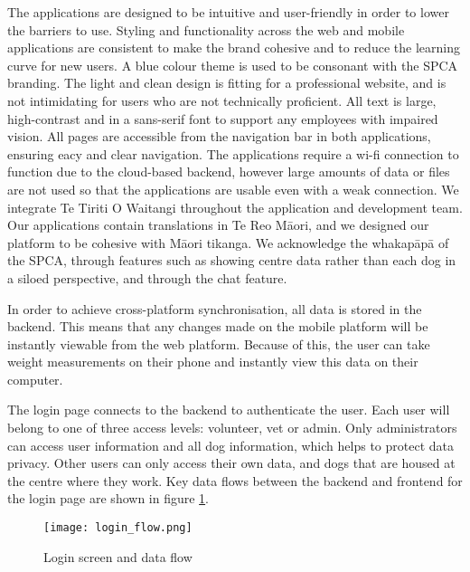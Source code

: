 The applications are designed to be intuitive and user-friendly in order to lower the barriers to use. Styling and functionality across the web and mobile applications are consistent to make the brand cohesive and to reduce the learning curve for new users. A blue colour theme is used to be consonant with the SPCA branding. The light and clean design is fitting for a professional website, and is not intimidating for users who are not technically proficient. All text is large, high-contrast and in a sans-serif font to support any employees with impaired vision. All pages are accessible from the navigation bar in both applications, ensuring eacy and clear navigation. The applications require a wi-fi connection to function due to the cloud-based backend, however large amounts of data or files are not used so that the applications are usable even with a weak connection. We integrate Te Tiriti O Waitangi throughout the application and development team. Our applications contain translations in Te Reo Māori, and we designed our platform to be cohesive with Māori tikanga. We acknowledge the whakapāpā of the SPCA, through features such as showing centre data rather than each dog in a siloed perspective, and through the chat feature. 

In order to achieve cross-platform synchronisation, all data is stored in the backend. This means that any changes made on the mobile platform will be instantly viewable from the web platform. Because of this, the user can take weight measurements on their phone and instantly view this data on their computer. 

The login page connects to the backend to authenticate the user. Each user will belong to one of three access levels: volunteer, vet or admin. Only administrators can access user information and all dog information, which helps to protect data privacy. Other users can only access their own data, and dogs that are housed at the centre where they work. Key data flows between the backend and frontend for the login page are shown in figure \ref{fig:mob_login}. 

\begin{figure}[!ht]
    \centering
    \texttt{[image: login\_flow.png]}
    \caption{Login screen and data flow}
    \label{fig:mob_login}
\end{figure}

